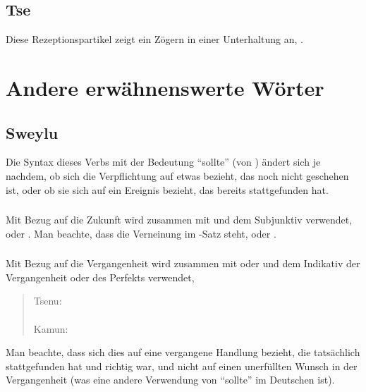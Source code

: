 \subsection{Tse} Diese Rezeptionspartikel zeigt ein Zögern in einer Unterhaltung an, . 

\section{Andere erwähnenswerte Wörter}

\subsection{Sweylu} \label{syn:sweylu} Die Syntax dieses Verbs mit der Bedeutung ``sollte'' (von  ) ändert sich je nachdem, ob sich die Verpflichtung auf etwas bezieht, das noch nicht geschehen ist, oder ob sie sich auf ein Ereignis bezieht, das bereits stattgefunden hat.

\subsubsection{} Mit Bezug auf die Zukunft wird  zusammen mit  und dem Subjunktiv verwendet,  oder  . Man beachte, dass die Verneinung im -Satz steht,  oder  .

\subsubsection{} Mit Bezug auf die Vergangenheit wird  zusammen mit  oder  und dem Indikativ der Vergangenheit oder des Perfekts verwendet,

\begin{quotation}
	\noindent Tsenu:  \\
	\indent{} \\
	
	\noindent Kamun: \\
	\indent{}
\end{quotation}

\noindent Man beachte, dass sich dies auf eine vergangene Handlung bezieht, die tatsächlich stattgefunden hat und richtig war, und nicht auf einen unerfüllten Wunsch in der Vergangenheit (was eine andere Verwendung von ``sollte'' im Deutschen ist).
